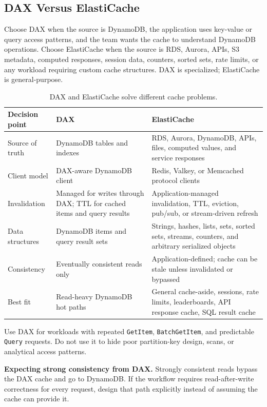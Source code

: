 \subsection{DAX Versus ElastiCache}
Choose DAX when the source is DynamoDB, the application uses key-value or query access patterns, and the team wants the cache to understand DynamoDB operations. Choose ElastiCache when the source is RDS, Aurora, APIs, S3 metadata, computed responses, session data, counters, sorted sets, rate limits, or any workload requiring custom cache structures. DAX is specialized; ElastiCache is general-purpose.
\begin{table}[H]
\centering
\small
\begin{tabular}{@{}p{3.2cm}p{5.0cm}p{5.0cm}@{}}
\toprule
\textbf{Decision point} & \textbf{DAX} & \textbf{ElastiCache} \\
\midrule
Source of truth & DynamoDB tables and indexes & RDS, Aurora, DynamoDB, APIs, files, computed values, and service responses \\
Client model & DAX-aware DynamoDB client & Redis, Valkey, or Memcached protocol clients \\
Invalidation & Managed for writes through DAX; TTL for cached items and query results & Application-managed invalidation, TTL, eviction, pub/sub, or stream-driven refresh \\
Data structures & DynamoDB items and query result sets & Strings, hashes, lists, sets, sorted sets, streams, counters, and arbitrary serialized objects \\
Consistency & Eventually consistent reads only & Application-defined; cache can be stale unless invalidated or bypassed \\
Best fit & Read-heavy DynamoDB hot paths & General cache-aside, sessions, rate limits, leaderboards, API response cache, SQL result cache \\
\bottomrule
\end{tabular}
\caption{DAX and ElastiCache solve different cache problems.}
\label{tab:ch4-dax-vs-elasticache}
\end{table}
\begin{tipbox}
Use DAX for workloads with repeated \texttt{GetItem}, \texttt{BatchGetItem}, and predictable \texttt{Query} requests. Do not use it to hide poor partition-key design, scans, or analytical access patterns.
\end{tipbox}
\begin{pitfall}
\textbf{Expecting strong consistency from DAX.} Strongly consistent reads bypass the DAX cache and go to DynamoDB. If the workflow requires read-after-write correctness for every request, design that path explicitly instead of assuming the cache can provide it.
\end{pitfall}
